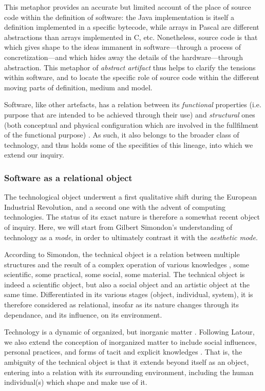 This metaphor provides an accurate but limited account of the place of source code within the definition of software: the Java implementation is itself a definition implemented in a specific bytecode, while arrays in Pascal are different abstractions than arrays implemented in C, etc. Nonetheless, source code is that which gives shape to the ideas immanent in software—through a process of concretization—and which hides away the details of the hardware—through abstraction. This metaphor of \emph{abstract artifact} thus helps to clarify the tensions within software, and to locate the specific role of source code within the different moving parts of definition, medium and model.

Software, like other artefacts, has a relation between its \emph{functional} properties (i.e. purpose that are intended to be achieved through their use) and \emph{structural} ones (both conceptual and physical configuration which are involved in the fullfilment of the functional purpose) \citep{turner_computational_2018}. As such, it also belongs to the broader class of technology, and thus holds some of the specifities of this lineage, into which we extend our inquiry.

\subsubsection{Software as a relational object}
\label{subsubsec:software-relational}

The technological object underwent a first qualitative shift during the European Industrial Revolution, and a second one with the advent of computing technologies. The status of its exact nature is therefore a somewhat recent object of inquiry. Here, we will start from Gilbert Simondon's understanding of technology as a \emph{mode}, in order to ultimately contrast it with the \emph{aesthetic mode}.

According to Simondon, the technical object is a relation between multiple structures and the result of a complex operation of various knowledges \citep{simondon_mode_1958}, some scientific, some practical, some social, some material. The technical object is indeed a scientific object, but also a social object and an artistic object at the same time. Differentiated in its various stages (object, individual, system), it is therefore considered as relational, insofar as its nature changes through its dependance, and its influence, on its environment.

Technology is a dynamic of organized, but inorganic matter \citep{stiegler_technics_1998}. Following Latour, we also extend the conception of inorganized matter to include social influences, personal practices, and forms of tacit and explicit knowledges \citep{latour_reassembling_2007}. That is, the ambiguity of the technical object is that it extends beyond itself as an object, entering into a relation with its surrounding environment, including the human individual(s) which shape and make use of it.

